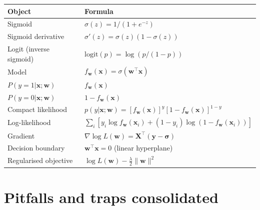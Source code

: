 \documentclass[11pt, a4paper]{article}
\newcommand{\thead}[1]{\textbf{#1}}
\begin{document}
\begin{tabularx}{\linewidth}{@{}lX@{}}
\toprule
\thead{Object} & \thead{Formula} \\
\midrule
Sigmoid                 & $\sigma(z) = 1/(1+e^{-z})$ \\
Sigmoid derivative      & $\sigma'(z) = \sigma(z)(1-\sigma(z))$ \\
Logit (inverse sigmoid) & $\mathrm{logit}(p) = \log(p/(1-p))$ \\
Model                   & $f_\mathbf{w}(\mathbf{x}) = \sigma(\mathbf{w}^\top\mathbf{x})$ \\
$P(y=1|\mathbf{x};\mathbf{w})$ & $f_\mathbf{w}(\mathbf{x})$ \\
$P(y=0|\mathbf{x};\mathbf{w})$ & $1 - f_\mathbf{w}(\mathbf{x})$ \\
Compact likelihood      & $p(y|\mathbf{x};\mathbf{w}) = [f_\mathbf{w}(\mathbf{x})]^y[1-f_\mathbf{w}(\mathbf{x})]^{1-y}$ \\
Log-likelihood          & $\sum_i[y_i\log f_\mathbf{w}(\mathbf{x}_i) + (1-y_i)\log(1-f_\mathbf{w}(\mathbf{x}_i))]$ \\
Gradient                & $\nabla\log L(\mathbf{w}) = \mathbf{X}^\top(\mathbf{y}-\boldsymbol\sigma)$ \\
Decision boundary       & $\mathbf{w}^\top\mathbf{x} = 0$ (linear hyperplane) \\
Regularised objective   & $\log L(\mathbf{w}) - \tfrac{\lambda}{2}\|\mathbf{w}\|^2$ \\
\bottomrule
\end{tabularx}

\section*{Pitfalls and traps consolidated}
\end{document}
